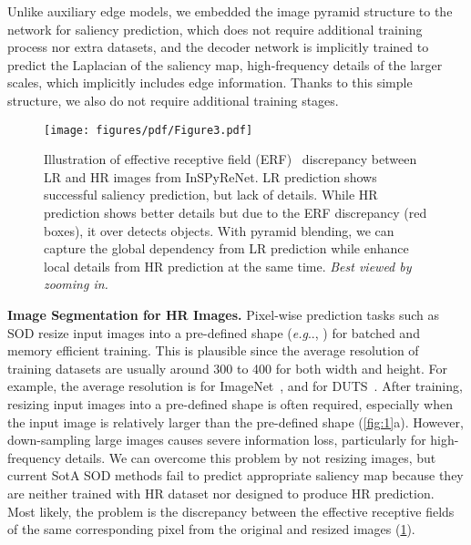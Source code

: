 \documentclass{llncs}
\makeatletter
\DeclareRobustCommand\onedot{\futurelet\@let@token\@onedot}
\def\@onedot{\ifx\@let@token.\else.\null\fi\xspace}
\def\eg{\emph{e.g}\onedot} \def\Eg{\emph{E.g}\onedot}
\makeatother
\begin{document}
Unlike auxiliary edge models, we embedded the image pyramid structure to the network for saliency prediction, 
which does not require additional training process nor extra datasets, and the decoder network is implicitly trained to predict the Laplacian of the saliency map, 
high-frequency details of the larger scales, which implicitly includes edge information. Thanks to this simple structure, we also do not require additional training stages.

\begin{figure}
    \centering
    \texttt{[image: figures/pdf/Figure3.pdf]} 
    \caption{Illustration of effective receptive field (ERF)~\cite{luo2016understanding} discrepancy between LR and HR images from InSPyReNet.
    LR prediction shows successful saliency prediction, but lack of details. While HR prediction shows better details but due to the ERF discrepancy (red boxes), it over detects objects.
    With pyramid blending, we can capture the global dependency from LR prediction while enhance local details from HR prediction at the same time. \textit{Best viewed by zooming in.}}
    \label{fig:3}
\end{figure} 
\noindent
\textbf{Image Segmentation for HR Images.} Pixel-wise prediction tasks such as SOD resize input images into a pre-defined shape (\eg, ) for batched and memory efficient training.
This is plausible since the average resolution of training datasets are usually around 300 to 400 for both width and height.
For example, the average resolution is  for ImageNet~\cite{russakovsky2015imagenet}, and  for DUTS~\cite{wang2017learning}.
After training, resizing input images into a pre-defined shape is often required, especially when the input image is relatively larger than the pre-defined shape (\cref{fig:1}a).
However, down-sampling large images causes severe information loss, particularly for high-frequency details. 
We can overcome this problem by not resizing images, but current SotA SOD methods fail to predict appropriate saliency map because they are neither trained with HR dataset nor designed to produce HR prediction.
Most likely, the problem is the discrepancy between the effective receptive fields~\cite{luo2016understanding} of the same corresponding pixel from the original and resized images (\cref{fig:3}).
\end{document}
